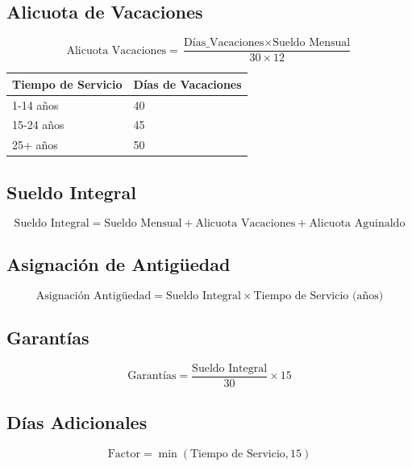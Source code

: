 \bigskip

\subsection{Alicuota de Vacaciones}

\[
\text{Alicuota Vacaciones} = \frac{\text{Días\_Vacaciones} \times \text{Sueldo Mensual}}{30 \times 12}
\]

\bigskip

\begin{center}
\begin{tabular}{ll}
\toprule
\textbf{Tiempo de Servicio} & \textbf{Días de Vacaciones} \\
\midrule
1-14 años & 40 \\
15-24 años & 45 \\
25+ años & 50 \\
\bottomrule
\end{tabular}
\end{center}

\bigskip

\subsection{Sueldo Integral}

\[
\text{Sueldo Integral} = \text{Sueldo Mensual} + \text{Alicuota Vacaciones} + \text{Alicuota Aguinaldo}
\]

\bigskip

\subsection{Asignación de Antigüedad}

\[
\text{Asignación Antigüedad} = \text{Sueldo Integral} \times \text{Tiempo de Servicio (años)}
\]

\bigskip

\subsection{Garantías}

\[
\text{Garantías} = \frac{\text{Sueldo Integral}}{30} \times 15
\]

\bigskip

\subsection{Días Adicionales}

\[
\text{Factor} = \min(\text{Tiempo de Servicio}, 15)
\]

